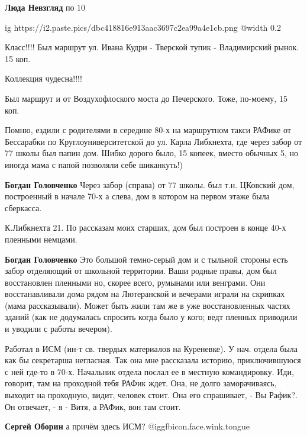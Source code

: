 \begin{itemize}
\textbf{Люда Невзгляд} по 10


\ifcmt
  ig https://i2.paste.pics/dbc418816e913aac3697c2ea99a4e1cb.png
  @width 0.2
\fi

Класс!!!! Был маршрут ул. Ивана Кудри - Тверской тупик - Владимирский рынок. 15 коп.

Коллекция чудесна!!!!

Был маршрут и от Воздухофлоского моста до Печерского. Тоже, по-моему, 15 коп.


Помню, ездили с родителями в середине 80-х на маршрутном такси РАФике от
Бессарабки по Круглоуниверситетской до ул. Карла Либкнехта, где через забор от
77 школы был папин дом. Шибко дорого было, 15 копеек, вместо обычных 5, но
иногда мама с папой позволяли себе шиканкуть!)

\begin{itemize} %
\textbf{Богдан Головченко} Через забор (справа) от 77 школы. был т.н. ЦКовский дом, построенный в начале 70-х а слева, дом в котором на первом этаже была сберкасса.

К.Либкнехта 21. По рассказам моих старших, дом был построен в конце 40-х пленными немцами.

\textbf{Богдан Головченко} Это большой темно-серый дом и с тыльной стороны есть забор отделяющий от школьной территории. Ваши родные правы, дом был восстановлен пленными но, скорее всего, румынами или венграми. Они восстанавливали дома рядом на Лютеранской и вечерами играли на скрипках (мама рассказывали). Может быть жили там же в уже восстановленных частях зданий (как не додумалась спросить когда было у кого; ведт пленных приводили и уводили с работы вечером).


Работал в ИСМ (ин-т св. твердых материалов на Куреневке). У нач. отдела была
как бы секретарша негласная. Так она мне рассказала историю, приключившуюся с
ней где-то в 70-х. Начальник отдела послал ее в местную командировку. Иди,
говорит, там на проходной тебя РАФик ждет. Она, не долго заморачиваясь, выходит
на проходную, видит, человек стоит. Она его спрашивает, - Вы Рафик?. Он
отвечает, - я - Витя, а РАФик, вон там стоит.


\textbf{Сергей Оборин} а причём здесь ИСМ? @igg{fbicon.face.wink.tongue} 


\end{itemize}
\end{itemize}
